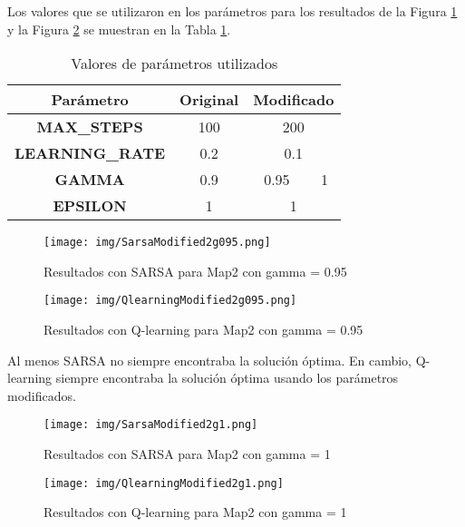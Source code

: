 \documentclass[
	spanish, %
	oneside
]{article}
\begin{document}
\noindent Los valores que se utilizaron en los parámetros para los resultados de la Figura \ref{fig:map2_sarsa_modified} y la Figura \ref{fig:map2_qlearning_modified} se muestran en la Tabla \ref{tab:my-table}.
\\
\begin{table}[H]
    \centering
    \begin{tabular}{|c|c|c|c|}
        \hline
        \rowcolor[HTML]{C0C0C0} 
        \textbf{Parámetro} & \textbf{Original} & \multicolumn{2}{c|}{\textbf{Modificado}} \\ \hline
        \textbf{MAX\_STEPS} & 100 & \multicolumn{2}{c|}{200} \\ \hline
        \textbf{LEARNING\_RATE} & 0.2 & \multicolumn{2}{c|}{0.1} \\ \hline
        \textbf{GAMMA} & 0.9 & 0.95 & 1 \\ \hline
        \textbf{EPSILON} & 1 & \multicolumn{2}{c|}{1} \\ \hline
    \end{tabular}
    \caption{Valores de parámetros utilizados}
    \label{tab:my-table}
\end{table}

\begin{figure}[H]
	\centering
	\texttt{[image: img/SarsaModified2g095.png]}
	\caption{Resultados con SARSA para Map2 con gamma = 0.95}
	\label{fig:map2_sarsa_modified}
\end{figure}

\begin{figure}[H]
	\centering
	\texttt{[image: img/QlearningModified2g095.png]}
	\caption{Resultados con Q-learning para Map2 con gamma = 0.95}
	\label{fig:map2_qlearning_modified}
\end{figure}

\noindent Al menos SARSA no siempre encontraba la solución óptima. En cambio, Q-learning siempre encontraba la solución óptima usando los parámetros modificados. \\

\begin{figure}[H]
	\centering
	\texttt{[image: img/SarsaModified2g1.png]}
	\caption{Resultados con SARSA para Map2 con gamma = 1}
	\label{fig:map2_sarsa_modified2}
\end{figure}

\begin{figure}[H]
	\centering
	\texttt{[image: img/QlearningModified2g1.png]}
	\caption{Resultados con Q-learning para Map2 con gamma = 1}
	\label{fig:map2_qlearning_modified2}
\end{figure}
\end{document}
